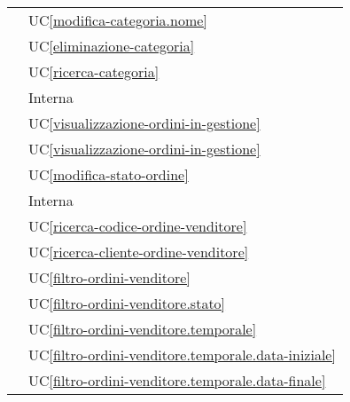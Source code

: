 \begin{longtable}{C{6cm} C{6cm}}
     & UC\ref{modifica-categoria.nome} \\

     & UC\ref{eliminazione-categoria} \\

     & UC\ref{ricerca-categoria} \\

     & Interna \\

     & UC\ref{visualizzazione-ordini-in-gestione} \\

     & UC\ref{visualizzazione-ordini-in-gestione} \\

     & UC\ref{modifica-stato-ordine} \\

     & Interna \\

     & UC\ref{ricerca-codice-ordine-venditore} \\
        
     & UC\ref{ricerca-cliente-ordine-venditore} \\
        
     & UC\ref{filtro-ordini-venditore} \\
        
     & UC\ref{filtro-ordini-venditore.stato} \\
        
     & UC\ref{filtro-ordini-venditore.temporale} \\
        
     & UC\ref{filtro-ordini-venditore.temporale.data-iniziale} \\
        
     & UC\ref{filtro-ordini-venditore.temporale.data-finale} \\


\end{longtable}
